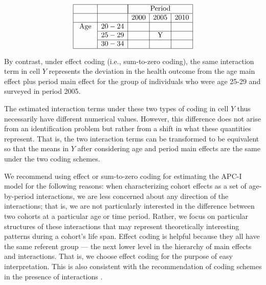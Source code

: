 \begin{center}
$$
\begin{array}{|c|c|c|c|c|}
\hline & & \multicolumn{3}{|c|} {\text { Period }}  \\
\hline & & 2000 & 2005 & 2010 \\
\hline \text { Age } & 20-24 & & & \\
\cline { 2 - 5 } & 25-29 & & \mathrm{Y} & \\
\cline { 2 - 5 } & 30-34 & & & \\
\hline
\end{array}
$$
\label{table:1}
\end{center}

By contrast, under effect coding (i.e., sum-to-zero coding), the same interaction term in cell $Y$ represents the deviation in the health outcome from the age main effect plus period main effect for the group of individuals who were age 25-29 and surveyed in period 2005. 

The estimated interaction terms under these two types of coding in cell $Y$ thus necessarily have different numerical values. However, this difference does not arise from an identification problem but rather from a shift in what these quantities represent.  That is, the two interaction terms can be transformed to be equivalent so that the means in $Y$ after considering age and period main effects are the same under the two coding schemes.  

We recommend using effect or sum-to-zero coding for estimating the APC-I model for the following reasons: when characterizing cohort effects as a set of age-by-period interactions, we are less concerned about any direction of the interactions; that is, we are not particularly interested in the difference between two cohorts at a particular age or time period.  Rather, we focus on particular structures of these interactions that may represent theoretically interesting patterns during a cohort's life span.  Effect coding is helpful because they all have the same referent group — the next lower level in the hierarchy of main effects and interactions. That is, we choose effect coding for the purpose of easy interpretation.  This is also consistent with the recommendation of coding schemes in the presence of interactions \citep{aiken_multiple_1991, jaccard_interaction_2003}.  

